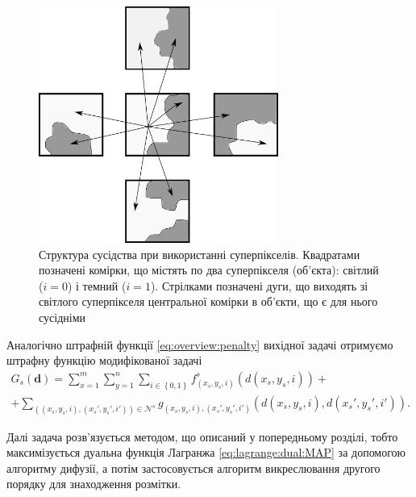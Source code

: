 \begin{figure}[h]
  \centering
  \includegraphics[width=0.7\textwidth]{images/neighbours_superpixel}
  \caption{Структура сусідства при використанні суперпікселів.
           Квадратами позначені комірки,
           що містять по два суперпікселя (об'єкта):
           світлий ($i = 0$) і темний ($i = 1$).
           Стрілками позначені дуги,
           що виходять зі світлого суперпікселя центральної комірки в об'єкти,
           що є для нього сусідніми}
  \label{fig:superpixel:neighbors}
\end{figure}

Аналогічно штрафній функції \eqref{eq:overview:penalty}
вихідної задачі отримуємо штрафну функцію модифікованої задачі
\begin{equation*}
\begin{gathered}
    G_s \left( \pmb{d} \right)
    = \sum \limits_{x = 1}^{m}
        \sum \limits_{y = 1}^{n}
            \sum \limits_{i \in \left\{ 0, 1 \right\}}
                f_{\left( x_s, y_s, i \right)}^s
                    \left( d \left(x_s, y_s, i \right) \right) + \\
    + \sum \limits_{\left( \left(x_s, y_s, i \right), \left(x_s', y_s', i' \right) \right) \in \mathcal{N}^s}
            g_{\left(x_s, y_s, i \right), \left(x_s', y_s', i' \right)} \left(
                d \left( x_s, y_s, i \right), d \left( x_s', y_s', i' \right)
            \right).
\end{gathered}
\end{equation*}

Далі задача розв'язується методом, що описаний у попередньому розділі,
тобто максимізується дуальна функція Лагранжа \eqref{eq:lagrange:dual:MAP}
за допомогою алгоритму дифузії,
а потім застосовується алгоритм викреслювання
другого порядку для знаходження розмітки.

